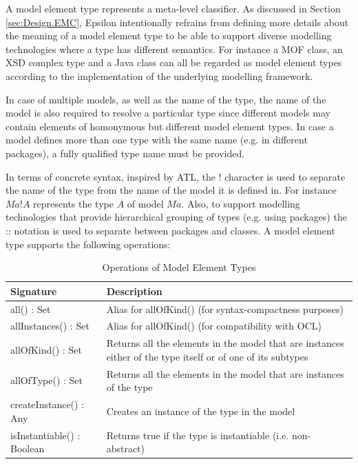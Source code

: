 A model element type represents a meta-level classifier. As discussed in Section \ref{sec:Design.EMC}, Epsilon intentionally refrains from defining more details about the meaning of a model element type to be able to support diverse modelling technologies where a type has different semantics. For instance a MOF class, an XSD complex type and a Java class can all be regarded as model element types according to the implementation of the underlying modelling framework.

In case of multiple models, as well as the name of the type, the name of the model is also required to resolve a particular type since different models may contain elements of homonymous but different model element types. In case a model defines more than one type with the same name (e.g. in different packages), a fully qualified type name must be provided.

In terms of concrete syntax, inspired by ATL, the ! character is used to separate the name of the type from the name of the model it is defined in. For instance $Ma!A$ represents the type $A$ of model $Ma$. Also, to support modelling technologies that provide hierarchical grouping of types (e.g. using packages) the :: notation is used to separate between packages and classes.  A model element type supports the following operations:

\begin{longtabu} {|p{6.5cm}|X|}
\caption{Operations of Model Element Types}
\label{tab:ModelElementTypesOperations}\\
\hline

    \textbf{Signature} & \textbf{Description} \\\hline

    all() : Set & Alias for allOfKind() (for syntax-compactness purposes) \\\hline
    
    allInstances() : Set & Alias for allOfKind() (for compatibility with OCL) \\\hline
    
    allOfKind() : Set & Returns all the elements in the model that are instances either of the type itself or of one of its subtypes  \\\hline
    
    allOfType() : Set & Returns all the elements in the model that are instances of the type \\\hline
    
    createInstance() : Any & Creates an instance of the type in the model \\\hline
    
    isInstantiable() : Boolean & Returns true if the type is instantiable (i.e. non-abstract)  \\\hline
\end{longtabu}

